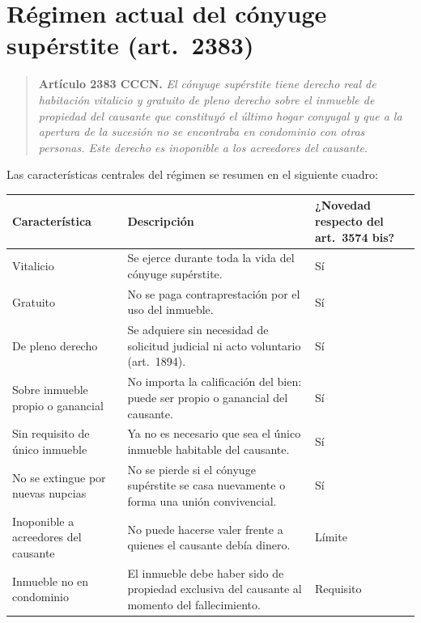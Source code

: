 \documentclass[12pt,oneside]{book}
\begin{document}
\section{Régimen actual del cónyuge supérstite (art.~2383)}

\begin{quote}
\textbf{Artículo 2383 CCCN.} \textit{El cónyuge supérstite tiene derecho real de habitación vitalicio y gratuito de pleno derecho sobre el inmueble de propiedad del causante que constituyó el último hogar conyugal y que a la apertura de la sucesión no se encontraba en condominio con otras personas. Este derecho es inoponible a los acreedores del causante.}
\end{quote}

Las características centrales del régimen se resumen en el siguiente cuadro:

\begin{table}[H]
\centering
\begin{tabularx}{\textwidth}{@{}>{\raggedright\arraybackslash}p{}>{\raggedright\arraybackslash}X>{\raggedright\arraybackslash}p{}@{}}
\toprule
\textbf{Característica} & \textbf{Descripción} & \textbf{¿Novedad respecto del art.~3574 bis?} \\
\midrule
Vitalicio & Se ejerce durante toda la vida del cónyuge supérstite. & Sí \\
Gratuito & No se paga contraprestación por el uso del inmueble. & Sí \\
De pleno derecho & Se adquiere sin necesidad de solicitud judicial ni acto voluntario (art.~1894). & Sí \\
Sobre inmueble propio o ganancial & No importa la calificación del bien: puede ser propio o ganancial del causante. & Sí \\
Sin requisito de único inmueble & Ya no es necesario que sea el único inmueble habitable del causante. & Sí \\
No se extingue por nuevas nupcias & No se pierde si el cónyuge supérstite se casa nuevamente o forma una unión convivencial. & Sí \\
Inoponible a acreedores del causante & No puede hacerse valer frente a quienes el causante debía dinero. & Límite \\
Inmueble no en condominio & El inmueble debe haber sido de propiedad exclusiva del causante al momento del fallecimiento. & Requisito \\
\bottomrule
\end{tabularx}
\end{table}
\end{document}
